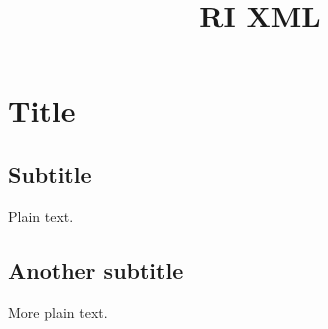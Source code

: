 \documentclass{article}
\title{RI XML}
\begin{document}
\maketitle

\section{Title}

\subsection{Subtitle}

Plain text.

\subsection{Another subtitle}

More plain text.
\end{document}
